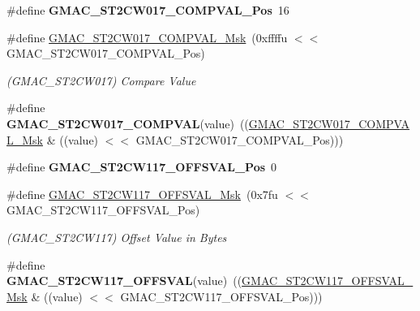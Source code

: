 \begin{DoxyCompactItemize}
\item 
\mbox{\label{group__SAMV71__GMAC_gae4e6d9115273e9545a1f372151954738}} 
\#define {\bfseries G\+M\+A\+C\+\_\+\+S\+T2\+C\+W017\+\_\+\+C\+O\+M\+P\+V\+A\+L\+\_\+\+Pos}~16
\item 
\mbox{\label{group__SAMV71__GMAC_gad131941a07f49beb389317d263ae04b8}} 
\#define \mbox{\hyperlink{group__SAMV71__GMAC_gad131941a07f49beb389317d263ae04b8}{G\+M\+A\+C\+\_\+\+S\+T2\+C\+W017\+\_\+\+C\+O\+M\+P\+V\+A\+L\+\_\+\+Msk}}~(0xffffu $<$$<$ G\+M\+A\+C\+\_\+\+S\+T2\+C\+W017\+\_\+\+C\+O\+M\+P\+V\+A\+L\+\_\+\+Pos)
\begin{DoxyCompactList}\small\item\em (G\+M\+A\+C\+\_\+\+S\+T2\+C\+W017) Compare Value \end{DoxyCompactList}\item 
\mbox{\label{group__SAMV71__GMAC_gab636070415000f3979e448b0aea742c9}} 
\#define {\bfseries G\+M\+A\+C\+\_\+\+S\+T2\+C\+W017\+\_\+\+C\+O\+M\+P\+V\+AL}(value)~((\mbox{\hyperlink{group__SAMV71__GMAC_gad131941a07f49beb389317d263ae04b8}{G\+M\+A\+C\+\_\+\+S\+T2\+C\+W017\+\_\+\+C\+O\+M\+P\+V\+A\+L\+\_\+\+Msk}} \& ((value) $<$$<$ G\+M\+A\+C\+\_\+\+S\+T2\+C\+W017\+\_\+\+C\+O\+M\+P\+V\+A\+L\+\_\+\+Pos)))
\item 
\mbox{\label{group__SAMV71__GMAC_ga5ff7c112979c302370a6bbf492a7ebed}} 
\#define {\bfseries G\+M\+A\+C\+\_\+\+S\+T2\+C\+W117\+\_\+\+O\+F\+F\+S\+V\+A\+L\+\_\+\+Pos}~0
\item 
\mbox{\label{group__SAMV71__GMAC_gab1a91e81a7a915110edd0cf0aeafb51c}} 
\#define \mbox{\hyperlink{group__SAMV71__GMAC_gab1a91e81a7a915110edd0cf0aeafb51c}{G\+M\+A\+C\+\_\+\+S\+T2\+C\+W117\+\_\+\+O\+F\+F\+S\+V\+A\+L\+\_\+\+Msk}}~(0x7fu $<$$<$ G\+M\+A\+C\+\_\+\+S\+T2\+C\+W117\+\_\+\+O\+F\+F\+S\+V\+A\+L\+\_\+\+Pos)
\begin{DoxyCompactList}\small\item\em (G\+M\+A\+C\+\_\+\+S\+T2\+C\+W117) Offset Value in Bytes \end{DoxyCompactList}\item 
\mbox{\label{group__SAMV71__GMAC_ga435aeb6edc4a56c1fd80ff04f0ef6e25}} 
\#define {\bfseries G\+M\+A\+C\+\_\+\+S\+T2\+C\+W117\+\_\+\+O\+F\+F\+S\+V\+AL}(value)~((\mbox{\hyperlink{group__SAMV71__GMAC_gab1a91e81a7a915110edd0cf0aeafb51c}{G\+M\+A\+C\+\_\+\+S\+T2\+C\+W117\+\_\+\+O\+F\+F\+S\+V\+A\+L\+\_\+\+Msk}} \& ((value) $<$$<$ G\+M\+A\+C\+\_\+\+S\+T2\+C\+W117\+\_\+\+O\+F\+F\+S\+V\+A\+L\+\_\+\+Pos)))

\end{DoxyCompactItemize}
